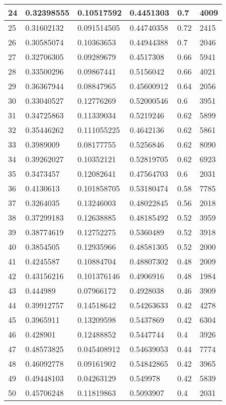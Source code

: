 \begin{longtable}{|l|l|l|l|l|l|}
24 & 0.32398555 & 0.10517592 & 0.4451303 & 0.7 & 4009 \\ \hline 
25 & 0.31602132 & 0.091514505 & 0.44740358 & 0.72 & 2415 \\ \hline 
26 & 0.30585074 & 0.10363653 & 0.44944388 & 0.7 & 2046 \\ \hline 
27 & 0.32706305 & 0.09289679 & 0.4517308 & 0.66 & 5941 \\ \hline 
28 & 0.33500296 & 0.09867441 & 0.5156042 & 0.66 & 4021 \\ \hline 
29 & 0.36367944 & 0.08847965 & 0.45600912 & 0.64 & 2056 \\ \hline 
30 & 0.33040527 & 0.12776269 & 0.52000546 & 0.6 & 3951 \\ \hline 
31 & 0.34725863 & 0.11339034 & 0.5219246 & 0.62 & 5899 \\ \hline 
32 & 0.35446262 & 0.111055225 & 0.4642136 & 0.62 & 5861 \\ \hline 
33 & 0.3989009 & 0.08177755 & 0.5256846 & 0.62 & 8090 \\ \hline 
34 & 0.39262027 & 0.10352121 & 0.52819705 & 0.62 & 6923 \\ \hline 
35 & 0.3473457 & 0.12082641 & 0.47564703 & 0.6 & 2031 \\ \hline 
36 & 0.4130613 & 0.101858705 & 0.53180474 & 0.58 & 7785 \\ \hline 
37 & 0.3264035 & 0.13246003 & 0.48022845 & 0.56 & 2018 \\ \hline 
38 & 0.37299183 & 0.12638885 & 0.48185492 & 0.52 & 3959 \\ \hline 
39 & 0.38774619 & 0.12752275 & 0.5360489 & 0.52 & 3918 \\ \hline 
40 & 0.3854505 & 0.12935966 & 0.48581305 & 0.52 & 2000 \\ \hline 
41 & 0.4245587 & 0.10884704 & 0.48807302 & 0.48 & 2009 \\ \hline 
42 & 0.43156216 & 0.101376146 & 0.4906916 & 0.48 & 1984 \\ \hline 
43 & 0.444989 & 0.07966172 & 0.4928038 & 0.46 & 3909 \\ \hline 
44 & 0.39912757 & 0.14518642 & 0.54263633 & 0.42 & 4278 \\ \hline 
45 & 0.3965911 & 0.13209598 & 0.5437869 & 0.42 & 6304 \\ \hline 
46 & 0.428901 & 0.12488852 & 0.5447744 & 0.4 & 3926 \\ \hline 
47 & 0.48573825 & 0.045408912 & 0.54639053 & 0.44 & 7774 \\ \hline 
48 & 0.46092778 & 0.09161902 & 0.54842865 & 0.42 & 3965 \\ \hline 
49 & 0.49448103 & 0.04263129 & 0.549978 & 0.42 & 5839 \\ \hline 
50 & 0.45706248 & 0.11819863 & 0.5093907 & 0.4 & 2031 \\ \hline 
\end{longtable}
